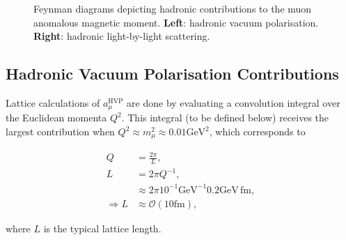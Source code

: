 \documentclass{article}
\numberwithin{equation}{section} %
\begin{document}
\begin{figure}[t]
    \centering
    \qquad
    \caption{Feynman diagrams depicting hadronic contributions to the muon anomalous magnetic moment. \textbf{Left}: hadronic vacuum polarisation. \textbf{Right}: hadronic light-by-light scattering.}%
    \label{hadfeynman}%
\end{figure}


\subsection{Hadronic Vacuum Polarisation Contributions}\label{hvp}

Lattice calculations of $a_\mu^\mathrm{HVP}$ are done by evaluating a convolution integral over the Euclidean momenta $Q^2$. This integral (to be defined below) receives the largest contribution when $Q^2\approx m_\mu^2\approx 0.01\mathrm{GeV}^2$, which corresponds to 

\begin{equation}
\begin{split}
Q &= \frac{2\pi}{L},\\
L &= 2\pi Q^{-1},\\
&\approx 2\pi 10^{-1} \mathrm{GeV}^{-1} 0.2 \mathrm{GeV \, fm},\\
\Rightarrow L &\approx \mathcal{O}(10\mathrm{fm}), 
\end{split}
\end{equation}

\noindent where $L$ is the typical lattice length\cite{dellamorte}.
\end{document}
